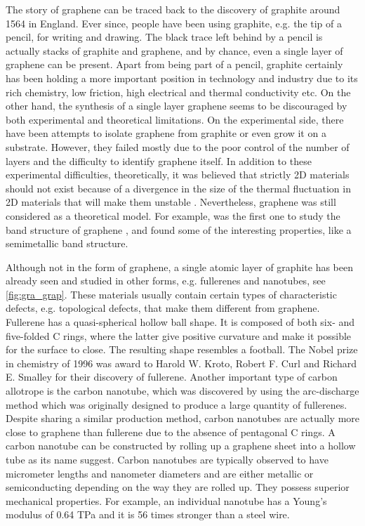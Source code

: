 The story of graphene can be traced back to the discovery of graphite around 1564 in England\cite{petroski1990pencil}. Ever since, people have been using graphite, e.g. the tip of a pencil, for writing and drawing. The black trace left behind by a pencil is actually stacks of graphite and graphene, and by chance, even a single layer of graphene can be present.  Apart from being part of a pencil, graphite certainly has been holding a more important position in technology and industry due to its rich chemistry, low friction, high electrical and thermal conductivity etc. On the other hand, the synthesis of a single layer graphene seems to be discouraged by both experimental and theoretical limitations. On the experimental side, there have been attempts\cite{Krishnan1997,Ohashi1997,Dresselhaus2002,Shioyama2001} to isolate graphene from graphite or even grow it on a substrate. However, they failed mostly due to the poor control of the number of layers and the difficulty to identify graphene itself.  In addition to these experimental difficulties, theoretically, it was believed that strictly 2D materials should not exist because of a divergence in the size of the thermal fluctuation in 2D materials that will make them unstable \cite{Peierls1935,Mermin1968}. Nevertheless, graphene was still considered as a theoretical model. For example, \citet{Wallace1947} was the first one to study the band structure of graphene \cite{CastroNeto2009}, and found some of the interesting properties, like a semimetallic band structure. 

Although not in the form of graphene, a single atomic layer of graphite has been already seen and studied in other forms, e.g. fullerenes and nanotubes, see \autoref{fig:gra_grap}. These materials usually contain certain types of characteristic defects, e.g. topological defects, that make them different from graphene.  Fullerene has a quasi-spherical hollow ball shape. It is composed of both six- and five-folded C rings, where the latter give positive curvature and make it possible for the surface to close. The resulting shape resembles a football\cite{Kroto1985,Lamb1990}. The Nobel prize in chemistry of 1996 was award to Harold W. Kroto, Robert F. Curl and Richard E. Smalley for their discovery of fullerene. Another important type of carbon allotrope is the carbon nanotube\cite{Iijima1993}, which was discovered by using the arc-discharge method\cite{Lamb1990} which was originally designed to produce a large quantity of fullerenes. Despite sharing a similar production method, carbon nanotubes are actually more close to graphene than fullerene due to the absence of pentagonal C rings. A carbon nanotube can be constructed by rolling up a graphene sheet into a hollow tube as its name suggest. Carbon nanotubes are typically observed to have micrometer lengths and nanometer diameters and are either metallic or semiconducting depending on the way they are rolled up. They possess superior mechanical properties. For example, an individual nanotube has a Young's modulus of 0.64 TPa and it is 56 times stronger than a steel wire\cite{Baughman787}.

